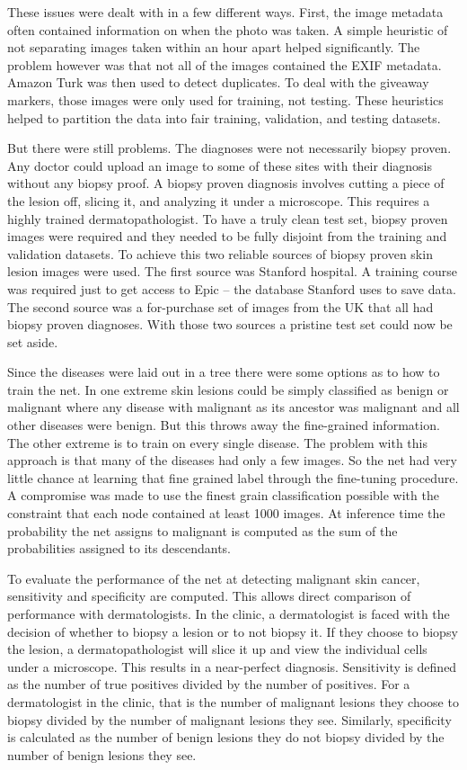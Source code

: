 These issues were dealt with in a few different ways.  First, the image metadata often contained information on when the photo was taken.  A simple heuristic of not separating images taken within an hour apart helped significantly.  The problem however was that not all of the images contained the EXIF metadata.  Amazon Turk was then used to detect duplicates.  To deal with the giveaway markers, those images were only used for training, not testing.  These heuristics helped to partition the data into fair training, validation, and testing datasets.

But there were still problems.  The diagnoses were not necessarily biopsy proven.  Any doctor could upload an image to some of these sites with their diagnosis without any biopsy proof.  A biopsy proven diagnosis involves cutting a piece of the lesion off, slicing it, and analyzing it under a microscope.  This requires a highly trained dermatopathologist.  To have a truly clean test set, biopsy proven images were required and they needed to be fully disjoint from the training and validation datasets.  To achieve this two reliable sources of biopsy proven skin lesion images were used.  The first source was Stanford hospital.  A training course was required just to get access to Epic -- the database Stanford uses to save data.  The second source was a for-purchase set of images from the UK that all had biopsy proven diagnoses.  With those two sources a pristine test set could now be set aside.

Since the diseases were laid out in a tree there were some options as to how to train the net.  In one extreme skin lesions could be simply classified as benign or malignant where any disease with malignant as its ancestor was malignant and all other diseases were benign.  But this throws away the fine-grained information.  The other extreme is to train on every single disease.  The problem with this approach is that many of the diseases had only a few images.  So the net had very little chance at learning that fine grained label through the fine-tuning procedure.  A compromise was made to use the finest grain classification possible with the constraint that each node contained at least 1000 images.  At inference time the probability the net assigns to malignant is computed as the sum of the probabilities assigned to its descendants.

To evaluate the performance of the net at detecting malignant skin cancer, sensitivity and specificity are computed.  This allows direct comparison of performance with dermatologists.  In the clinic, a dermatologist is faced with the decision of whether to biopsy a lesion or to not biopsy it.  If they choose to biopsy the lesion, a dermatopathologist will slice it up and view the individual cells under a microscope.  This results in a near-perfect diagnosis.  Sensitivity is defined as the number of true positives divided by the number of positives.  For a dermatologist in the clinic, that is the number of malignant lesions they choose to biopsy divided by the number of malignant lesions they see.  Similarly, specificity is calculated as the number of benign lesions they do not biopsy divided by the number of benign lesions they see.

